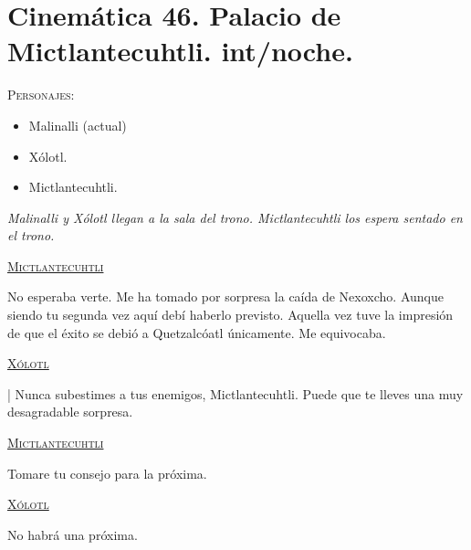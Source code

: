 \documentclass[11pt,letterpaper]{article}
\begin{document}
\section{Cinemática 46. Palacio de Mictlantecuhtli. int/noche.}
 \textsc{Personajes}:
 \begin{itemize}
 \item Malinalli (actual)
 \item Xólotl.
 \item Mictlantecuhtli.
 \end{itemize}
\textit{Malinalli y Xólotl llegan a la sala del trono. Mictlantecuhtli los espera sentado en el trono. }
\begin{center}
\textsc{\underline{Mictlantecuhtli}}
\\
\par
No esperaba verte. Me ha tomado por sorpresa la caída de Nexoxcho. Aunque siendo tu segunda vez aquí debí haberlo previsto. Aquella vez tuve la impresión de que el éxito se debió a Quetzalcóatl únicamente. Me equivocaba.
\\
\par
\textsc{\underline{Xólotl}}
\\
\par|
Nunca subestimes a tus enemigos,  Mictlantecuhtli. Puede que te lleves una muy desagradable sorpresa.
\\
\par
\textsc{\underline{Mictlantecuhtli}}
\\
\par
Tomare tu consejo para la próxima.
\\
\par
\textsc{\underline{Xólotl}}
\\
\par
No habrá una próxima.  
\end{center}
\end{document}
